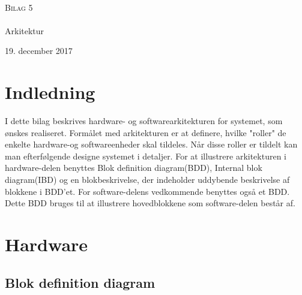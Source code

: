 

\begin{titlingpage}
\begin{center}

~ \\[3cm]


\textsc{\LARGE Bilag 5}\\[1.5cm]


\noindent\makebox[\linewidth]{\rule{\textwidth}{0.4pt}}\\
[0.5cm]{\Huge Arkitektur}
\noindent\makebox[\linewidth]{\rule{\textwidth}{0.4pt}}
\end{center}
\vfill
\begin{center}
{\large 19. december 2017}
\end{center}
\end{titlingpage}

\newpage
\tableofcontents*
\newpage

\chapter{Indledning}

I dette bilag beskrives hardware- og softwarearkitekturen for systemet, som ønskes realiseret. Formålet med arkitekturen er at definere, hvilke "roller"  de enkelte hardware-og softwareenheder skal tildeles. Når disse roller er tildelt kan man efterfølgende designe systemet i detaljer. For at illustrere arkitekturen i hardware-delen benyttes Blok definition diagram(BDD), Internal blok diagram(IBD) og en blokbeskrivelse, der indeholder uddybende beskrivelse af blokkene i BDD'et. For software-delens vedkommende benyttes også et BDD. Dette BDD bruges til at illustrere hovedblokkene som software-delen består af.       





\chapter{Hardware}
\section{Blok definition diagram}

